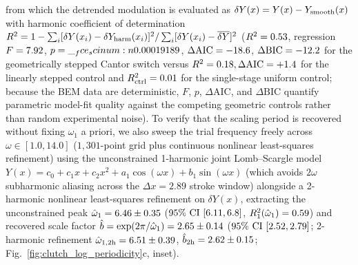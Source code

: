 \documentclass[pdflatex,sn-nature]{sn-jnl}
\DeclareRobustCommand{\scinum}[1]{\__fce_scinum:n{#1}}
\DeclareRobustCommand{\roundone}[1]{\fpeval{round(#1,1)}}
\DeclareRobustCommand{\roundtwo}[1]{\fpeval{round(#1,2)}}
\begin{document}
from which the detrended modulation is evaluated as $\delta Y(x) = Y(x) - Y_{\rm smooth}(x)$ with harmonic coefficient of determination $R^2 = 1 - \sum_i [\delta Y(x_i) - \delta Y_{\rm harm}(x_i)]^2 / \sum_i [\delta Y(x_i) - \overline{\delta Y}]^2$ ($R^2 = \roundtwo{\LogperSteppedRzRtwo}$, regression $F = \roundtwo{\LogperSteppedRzFstatCantor}$, $p = \scinum{\LogperSteppedRzPvalCantor}$, $\Delta\mathrm{AIC} = \roundone{\LogperSteppedRzDeltaAicCantor}$, $\Delta\mathrm{BIC} = \roundone{\LogperSteppedRzDeltaBicCantor}$ for the geometrically stepped Cantor switch versus $R^2 = \roundtwo{\LogperSteppedRzRtwoLinear}, \Delta\mathrm{AIC} = +\roundone{\LogperSteppedRzDeltaAicLinear}$ for the linearly stepped control and $R^2_{\rm ctrl} = \roundtwo{\LogperSteppedRzRtwoUniform}$ for the single-stage uniform control; because the BEM data are deterministic, $F$, $p$, $\Delta\mathrm{AIC}$, and $\Delta\mathrm{BIC}$ quantify parametric model-fit quality against the competing geometric controls rather than random experimental noise). To verify that the scaling period is recovered without fixing $\omega_1$ a priori, we also sweep the trial frequency freely across $\omega \in [1.0, 14.0]$ ($1{,}301$-point grid plus continuous nonlinear least-squares refinement) using the unconstrained 1-harmonic joint Lomb--Scargle model $Y(x) = c_0 + c_1 x + c_2 x^2 + a_1 \cos(\omega x) + b_1 \sin(\omega x)$ (which avoids $2\omega$ subharmonic aliasing across the $\Delta x = 2.89$ stroke window) alongside a 2-harmonic nonlinear least-squares refinement on $\delta Y(x)$, extracting the unconstrained peak $\hat{\omega}_1 = \roundtwo{\LogperFreeOmegaoneCantor} \pm \roundtwo{\LogperFreeOmegaoneCininefiveHalfCantor}$ ($95\%\text{ CI } [\roundtwo{\LogperFreeOmegaoneCininefiveLowCantor}, \roundtwo{\LogperFreeOmegaoneCininefiveHighCantor}]$, $R^2_1(\hat{\omega}_1) = \roundtwo{\LogperFreeRtwoPeakCantor}$) and recovered scale factor $\hat{b} = \exp(2\pi/\hat{\omega}_1) = \roundtwo{\LogperFreeBHatCantor} \pm \roundtwo{\LogperFreeBHatCininefiveHalfCantor}$ ($95\%\text{ CI } [\roundtwo{\LogperFreeBHatCininefiveLowCantor}, \roundtwo{\LogperFreeBHatCininefiveHighCantor}]$; 2-harmonic refinement $\hat{\omega}_{1,\rm 2h} = \roundtwo{\LogperFreeOmegaoneTwohCantor} \pm \roundtwo{\LogperFreeOmegaoneTwohCininefiveHalfCantor}$, $\hat{b}_{\rm 2h} = \roundtwo{\LogperFreeBHatTwohCantor} \pm \roundtwo{\LogperFreeBHatTwohCininefiveHalfCantor}$; Fig.~\ref{fig:clutch_log_periodicity}c, inset).
\end{document}
